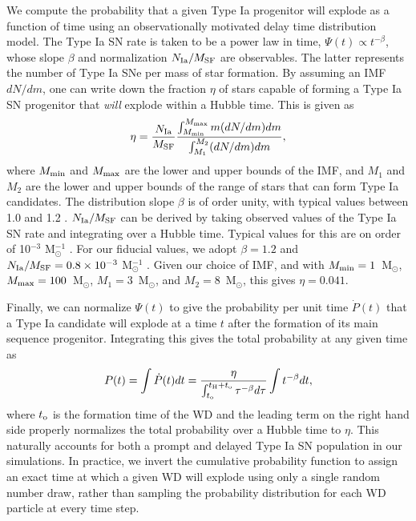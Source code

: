 \documentclass[twocolumn]{aastex61}
\begin{document}
We compute the probability that a given Type Ia progenitor will explode as a function of time using an observationally motivated delay time distribution model. The Type Ia SN rate is taken to be a power law in time, $\Psi (t) \propto t^{-\beta}$, whose slope $\beta$ and normalization $N_{\rm Ia}/M_{\rm SF}$ are observables. The latter represents the number of Type Ia SNe per mass of star formation.  By assuming an IMF  $dN/dm$, one can write down the fraction $\eta$ of stars capable of forming a Type Ia SN progenitor that \textit{will} explode within a Hubble time. This is given as
\begin{equation}
\eta = \frac{N_{\rm Ia}}{M_{\rm SF}} \frac{\int_{M_{\rm min}}^{M_{\rm max}} m (dN/dm) dm }{\int_{M_{1}}^{M_{2}} (dN/dm) dm},
\end{equation}
where $M_{\rm min}$ and $M_{\rm max}$ are the lower and upper bounds of the IMF, and $M_{1}$ and $M_{2}$ are the lower and upper bounds of the range of stars that can form Type Ia candidates. The distribution slope $\beta$ is of order unity, with typical values between 1.0 and 1.2 \citep[see][for a recent review]{Maoz2014}. $N_{\rm Ia}/M_{\rm SF}$ can be derived by taking observed values of the Type Ia SN rate and integrating over a Hubble time. Typical values for this are on order of 10$^{-3}$ M$_{\odot}^{-1}$ \citep{Maoz2014}. For our fiducial values, we adopt $\beta = 1.2$ \citep{Maoz2010} and $N_{\rm Ia}/M_{\rm SF} = 0.8\times 10^{-3}$ M$_{\odot}^{-1}$ \citep{GraurMaoz2013}. Given our choice of IMF, and with $M_{\rm min} = 1$~M$_{\odot}$, $M_{\rm max}=100$~M$_{\odot}$, $M_{1}=3$~M$_{\odot}$, and $M_{2}=8$~M$_{\odot}$, this gives $\eta = 0.041$.

Finally, we can normalize $\Psi(t)$ to give the probability per unit time $\dot{P}(t)$ that a Type Ia candidate will explode at a time $t$ after the formation of its main sequence progenitor. Integrating this gives the total probability at any given time as
\begin{equation}
P(t) = \int \dot{P}(t)dt = \frac{\eta}{{ \int_{t_{\rm o}}^{t_{\rm H} + t_{\rm o}} \tau^{-\beta} d\tau}} \int t^{-\beta} dt,
\end{equation}
where $t_{\rm o}$ is the formation time of the WD and the leading term on the right hand side properly normalizes the total probability over a Hubble time to $\eta$. This naturally accounts for both a prompt and delayed Type Ia SN population in our simulations.
In practice, we invert the cumulative probability function to assign an exact time at which a given WD will explode using only a single random number draw, rather than sampling the probability distribution for each WD particle at every time step.
\end{document}
